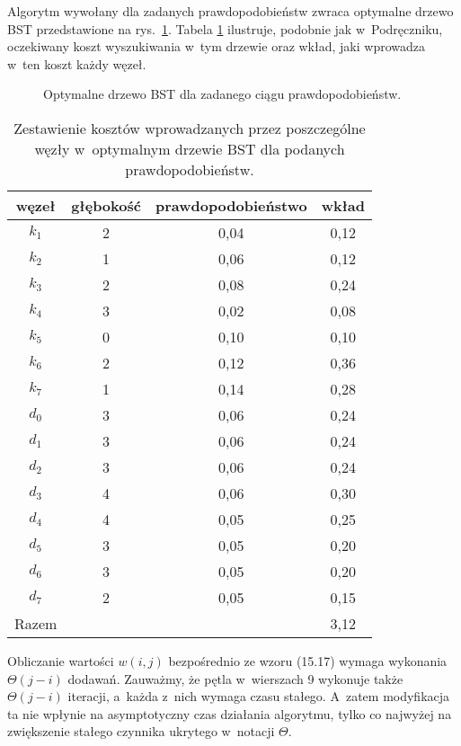 \exercise %
Algorytm  wywołany dla zadanych prawdopodobieństw zwraca optymalne drzewo BST przedstawione na rys.\ \ref{fig:15.5-2}.
Tabela \ref{tab:15.5-2} ilustruje, podobnie jak w~Podręczniku, oczekiwany koszt wyszukiwania w~tym drzewie oraz wkład, jaki wprowadza w~ten koszt każdy węzeł.
\begin{figure}[!ht]
	\centering 
	\caption{Optymalne drzewo BST dla zadanego ciągu prawdopodobieństw.} \label{fig:15.5-2}
\end{figure}
\begin{table}[!ht]
	\centering
		\begin{tabular}{cccc}
			węzeł & głębokość & prawdopodobieństwo & wkład \\ \hline
			$k_1$ & 2 & 0{,}04 & 0{,}12 \\
			$k_2$ & 1 & 0{,}06 & 0{,}12 \\
			$k_3$ & 2 & 0{,}08 & 0{,}24 \\
			$k_4$ & 3 & 0{,}02 & 0{,}08 \\
			$k_5$ & 0 & 0{,}10 & 0{,}10 \\
			$k_6$ & 2 & 0{,}12 & 0{,}36 \\
			$k_7$ & 1 & 0{,}14 & 0{,}28 \\
			$d_0$ & 3 & 0{,}06 & 0{,}24 \\
			$d_1$ & 3 & 0{,}06 & 0{,}24 \\
			$d_2$ & 3 & 0{,}06 & 0{,}24 \\
			$d_3$ & 4 & 0{,}06 & 0{,}30 \\
			$d_4$ & 4 & 0{,}05 & 0{,}25 \\
			$d_5$ & 3 & 0{,}05 & 0{,}20 \\
			$d_6$ & 3 & 0{,}05 & 0{,}20 \\
			$d_7$ & 2 & 0{,}05 & 0{,}15 \\ \hline
			Razem & & & 3{,}12
		\end{tabular} \caption{Zestawienie kosztów wprowadzanych przez poszczególne węzły w~optymalnym drzewie BST dla podanych prawdopodobieństw.} \label{tab:15.5-2}
\end{table}

\exercise %
Obliczanie wartości $w(i,j)$ bezpośrednio ze wzoru (15.17) wymaga wykonania $\Theta(j-i)$ dodawań.
Zauważmy, że pętla  w~wierszach 9 wykonuje także $\Theta(j-i)$ iteracji, a~każda z~nich wymaga czasu stałego.
A~zatem modyfikacja ta nie wpłynie na asymptotyczny czas działania algorytmu, tylko co najwyżej na zwiększenie stałego czynnika ukrytego w~notacji $\Theta$.

